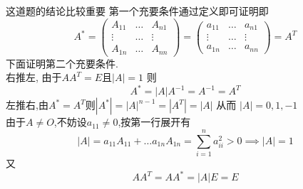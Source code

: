 \documentclass[12pt, a4paper, oneside, UTF8]{ctexbook}
\begin{document}
\begin{enumerate}
    \begin{solution}
    {\color{red} 这道题的结论比较重要} 第一个充要条件通过定义即可证明即
    $$
    A^{*}=\begin{pmatrix}
        A_{11} &\ldots & A_{n1} \\
        \vdots &\ldots & \vdots \\
        A_{1n} &\ldots & A_{nn} 
    \end{pmatrix} = \begin{pmatrix}
        a_{11} &\ldots & a_{n1} \\
        \vdots &\ldots & \vdots \\
        a_{1n} &\ldots & a_{nn} 
    \end{pmatrix} = A^{T}
    $$
    下面证明第二个充要条件. \\
    右推左, 由于$AA^T=E$且$\left|A\right|=1$ 则
    $$
    A^{*}=\left|A\right|A^{-1}=A^{-1}=A^{T}
    $$
    左推右,由$A^{*}=A^{T}$则$\left|A^*\right|=\left|A\right|^{n-1}=\left|A^{T}\right|=\left|A\right|$ 从而
    $\left|A\right|=0,1,-1$ \\
    由于$A\neq O$,不妨设$a_11\neq 0$,按第一行展开有
    $$
    \left|A\right| = a_{11}A_{11} + \ldots a_{1n}A_{1n} = \sum_{i=1}^{n}a_{ii}^2 > 0 \implies \left|A\right| = 1
    $$
    又
    $$
    AA^{T}=AA^*=\left|A\right|E=E
    $$
    \end{solution}
\end{enumerate}
\end{document}
